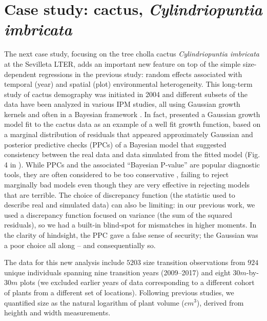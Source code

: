 \documentclass[11pt]{article}
\begin{document}
{\clearpage   

\section{Case study: cactus, \emph{Cylindriopuntia imbricata}}
The next case study, focusing on the tree cholla cactus \emph{Cylindriopuntia imbricata} at the Sevilleta LTER, adds an important new
feature on top of the simple size-dependent regressions in the previous study: random effects associated with temporal (year) and spatial (plot) environmental heterogeneity. 
This long-term study of cactus demography was initiated in 2004 and different subsets of the data have been analyzed in various IPM studies, all using Gaussian growth kernels and often in a Bayesian framework \citep{miller2009impacts,czachurademographic,compagnoni2016effect,ohm2014balancing,elderd2016quantifying}.
In fact, \citep{elderd2016quantifying} presented a Gaussian growth model fit to the cactus data as an example of a well fit growth function, based on a marginal distribution of residuals that appeared approximately Gaussian and posterior predictive checks (PPCs) of a Bayesian model that suggested consistency between the real data and data simulated from the fitted model (Fig. 4 in \citep{elderd2016quantifying}). 
While PPCs and the associated ``Bayesian P-value'' are popular diagnostic tools, they are often considered to be too conservative \citep{conn2018guide,zhang2014comparative}, failing to reject marginally bad models even though they are very effective in rejecting models that are terrible.
The choice of discrepancy function (the statistic used to describe real and simulated data) can also be limiting: in our previous work, we used a discrepancy function focused on variance (the sum of the squared residuals), so we had a built-in blind-spot for mismatches in higher moments.
In the clarity of hindsight, the PPC gave a false sense of security; the Gaussian was a poor choice all along -- and consequentially so.

The data for this new analysis include $5203$ size transition observations from $924$ unique individuals spanning nine transition years (2009--2017) and eight $30m$-by-$30m$ plots (we excluded earlier years of data corresponding to a different cohort of plants from a different set of locations). 
Following previous studies, we quantified size as the natural logarithm of plant volume ($cm^3$), derived from heighth and width measurements. 

}
\end{document}
